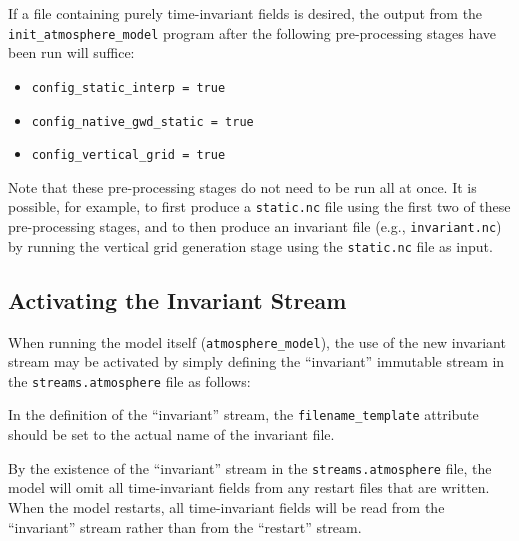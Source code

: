 If a file containing purely time-invariant fields is desired, the output from
the {\tt init\_atmosphere\_model} program after the following pre-processing
stages have been run will suffice:

\begin{itemize}
\item {\tt config\_static\_interp = true}
\item {\tt config\_native\_gwd\_static = true}
\item {\tt config\_vertical\_grid = true}
\end{itemize}

Note that these pre-processing stages do not need to be run all at once. It is
possible, for example, to first produce a {\tt static.nc} file using the first
two of these pre-processing stages, and to then produce an invariant file (e.g.,
{\tt invariant.nc}) by running the vertical grid generation stage using the
{\tt static.nc} file as input.

\subsection{Activating the Invariant Stream}
\label{sec:invariant_stream}

When running the model itself ({\tt atmosphere\_model}), the use of the new
invariant stream may be activated by simply defining the ``invariant'' immutable
stream in the {\tt streams.atmosphere} file as follows:

\vspace{12pt}
 \newline
\hspace*{\immindent}{\tt type="input"} \newline
\hspace*{\immindent}{\tt filename\_template="invariant.nc"} \newline
\hspace*{\immindent}{\tt input\_interval="initial\_only" />} \newline
\vspace{12pt}

\noindent In the definition of the ``invariant'' stream, the {\tt filename\_template}
attribute should be set to the actual name of the invariant file.

By the existence of the ``invariant'' stream in the {\tt streams.atmosphere} file,
the model will omit all time-invariant fields from any restart files that are
written. When the model restarts, all time-invariant fields will be read from
the ``invariant'' stream rather than from the ``restart'' stream.


